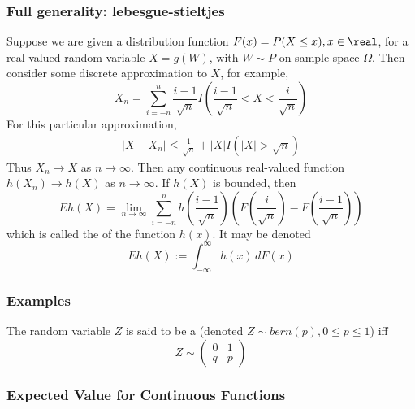 \documentclass[11pt]{article}
\numberwithin{equation}{section}
\begin{document}
\subsubsection{Full generality: lebesgue-stieltjes}
Suppose we are given a distribution function $F(x) = P(X \leq x), x \in \real$, for a real-valued random variable $X = g(W)$, with $W \sim P$ on sample space $\Omega$. Then consider some discrete approximation to $X$, for example,
\begin{equation}
	X_n = \sum_{i = -n}^n \frac{i-1}{\sqrt{n}}I\left(\frac{i-1}{\sqrt{n}} < X < \frac{i}{\sqrt{n}}\right)
\end{equation}
For this particular approximation,
\begin{align*}
	|X - X_n| \leq \frac{1}{\sqrt{n}} + |X|I(|X| > \sqrt{n})
\end{align*}
Thus $X_n \rightarrow X$ as $n \rightarrow \infty$. Then any continuous real-valued function $h(X_n) \rightarrow h(X)$ as $n \rightarrow \infty$. If $h(X)$ is bounded, then
\begin{equation}
	Eh(X) = \lim_{n \rightarrow \infty} \sum_{i = -n}^n h(\frac{i-1}{\sqrt{n}})\left(F(\frac{i}{\sqrt{n}}) - F(\frac{i-1}{\sqrt{n}})\right)
\end{equation}
which is called the  of the function $h(x)$. It may be denoted
\begin{equation}
	Eh(X) := \int_{-\infty}^\infty h(x)\,dF(x)
\end{equation}

\subsubsection{Examples}
The random variable $Z$ is said to be a  (denoted $Z \sim bern(p), 0 \leq p \leq 1$) iff
$$Z \sim \begin{pmatrix}
	0 & 1 \\
	q & p
\end{pmatrix}$$

\subsubsection{Expected Value for Continuous Functions}
\end{document}
